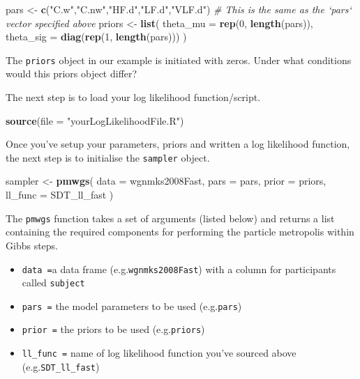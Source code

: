 \documentclass[]{book}
\newenvironment{Shaded}{\begin{snugshade}}{\end{snugshade}}
\newcommand{\CommentTok}[1]{\textcolor[rgb]{0.56,0.35,0.01}{\textit{#1}}}
\newcommand{\DataTypeTok}[1]{\textcolor[rgb]{0.13,0.29,0.53}{#1}}
\newcommand{\DecValTok}[1]{\textcolor[rgb]{0.00,0.00,0.81}{#1}}
\newcommand{\KeywordTok}[1]{\textcolor[rgb]{0.13,0.29,0.53}{\textbf{#1}}}
\newcommand{\NormalTok}[1]{#1}
\newcommand{\StringTok}[1]{\textcolor[rgb]{0.31,0.60,0.02}{#1}}
\providecommand{\tightlist}{%
  \setlength{\itemsep}{0pt}\setlength{\parskip}{0pt}}
\begin{document}
\begin{Shaded}
\begin{Highlighting}[]
\NormalTok{pars <-}\StringTok{ }\KeywordTok{c}\NormalTok{(}\StringTok{"C.w"}\NormalTok{,}\StringTok{"C.nw"}\NormalTok{,}\StringTok{"HF.d"}\NormalTok{,}\StringTok{"LF.d"}\NormalTok{,}\StringTok{"VLF.d"}\NormalTok{) }\CommentTok{# This is the same as the `pars` vector specified above}
\NormalTok{priors <-}\StringTok{ }\KeywordTok{list}\NormalTok{(}
  \DataTypeTok{theta_mu =} \KeywordTok{rep}\NormalTok{(}\DecValTok{0}\NormalTok{, }\KeywordTok{length}\NormalTok{(pars)),}
  \DataTypeTok{theta_sig =} \KeywordTok{diag}\NormalTok{(}\KeywordTok{rep}\NormalTok{(}\DecValTok{1}\NormalTok{, }\KeywordTok{length}\NormalTok{(pars)))}
\NormalTok{)}
\end{Highlighting}
\end{Shaded}

The \texttt{priors} object in our example is initiated with zeros. Under what conditions would this priors object differ?

The next step is to load your log likelihood function/script.

\begin{Shaded}
\begin{Highlighting}[]
\KeywordTok{source}\NormalTok{(}\DataTypeTok{file =} \StringTok{"yourLogLikelihoodFile.R"}\NormalTok{)}
\end{Highlighting}
\end{Shaded}

Once you've setup your parameters, priors and written a log likelihood function, the next step is to initialise the \texttt{sampler} object.

\begin{Shaded}
\begin{Highlighting}[]
\NormalTok{sampler <-}\StringTok{ }\KeywordTok{pmwgs}\NormalTok{(}
  \DataTypeTok{data =}\NormalTok{ wgnmks2008Fast,}
  \DataTypeTok{pars =}\NormalTok{ pars,}
  \DataTypeTok{prior =}\NormalTok{ priors,}
  \DataTypeTok{ll_func =}\NormalTok{ SDT_ll_fast}
\NormalTok{)}
\end{Highlighting}
\end{Shaded}

The \texttt{pmwgs} function takes a set of arguments (listed below) and returns a list containing the required components for performing the particle metropolis within Gibbs steps.

\begin{itemize}
\tightlist
\item
  \texttt{data\ =}a data frame (e.g.\texttt{wgnmks2008Fast}) with a column for participants called \texttt{subject}
\item
  \texttt{pars\ =} the model parameters to be used (e.g.\texttt{pars})
\item
  \texttt{prior\ =} the priors to be used (e.g.\texttt{priors})
\item
  \texttt{ll\_func\ =} name of log likelihood function you've sourced above (e.g.\texttt{SDT\_ll\_fast})
\end{itemize}
\end{document}
